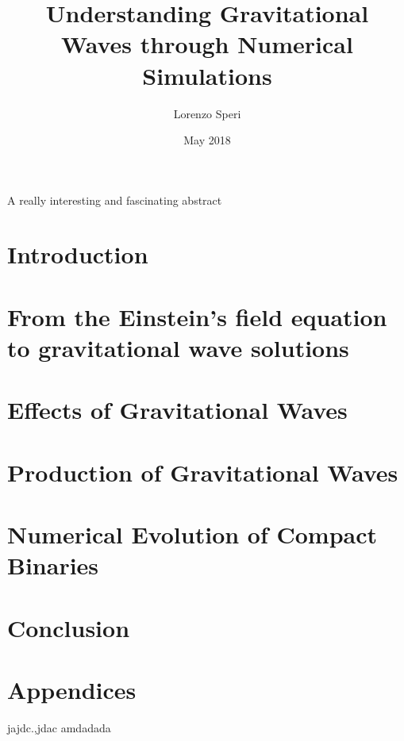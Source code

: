 \documentclass[twoside,english, a4paper, 12pt]{shared/uiofysmaster}
\author{Lorenzo Speri}
\title{\bf{Understanding Gravitational Waves through Numerical Simulations}}
\date{May 2018}
\begin{document}

\maketitle
\clearpage

\tableofcontents
\clearpage

\begin{abstract1}
A really interesting and fascinating abstract
\end{abstract1}

\clearpage
\section{Introduction}


\clearpage
\section{From the Einstein's field equation\\ to gravitational wave solutions}


\clearpage
\section{Effects of Gravitational Waves}


\clearpage
\section{Production of Gravitational Waves}


\clearpage
\section{Numerical Evolution of Compact Binaries}


\clearpage
\section{Conclusion}


\clearpage
\section{Appendices}

jajdc.,jdac amdadada
\cite{taniguchiVariousFeaturesQuasiequilibrium2003}
%

\printbibliography


\end{document}
